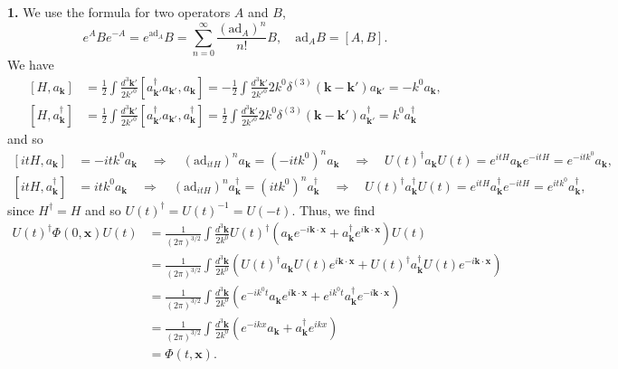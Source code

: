 \textbf{1.} We use the formula for two operators $A$ and $B$,
\begin{equation}
    e^A B e^{-A} = e^{\text{ad}_A} B = \sum_{n=0}^\infty \frac{(\text{ad}_A)^n}{n!} B, \quad \text{ad}_A B = [A, B].
\end{equation}
We have
\begin{equation}
\begin{aligned}
    [H, a_{\mathbf{k}}] &= \frac{1}{2} \int \frac{d^3\mathbf{k}'}{2k'^0} [a^\dagger_{\mathbf{k}'}a_{\mathbf{k}'}, a_{\mathbf{k}}] = -\frac{1}{2} \int \frac{d^3\mathbf{k}'}{2k'^0} 2k^0\delta^{(3)}(\mathbf{k}-\mathbf{k}') a_{\mathbf{k}'} = -k^0 a_{\mathbf{k}}, \\
    [H, a^\dagger_{\mathbf{k}}] &= \frac{1}{2} \int \frac{d^3\mathbf{k}'}{2k'^0} [a^\dagger_{\mathbf{k}'}a_{\mathbf{k}'}, a^\dagger_{\mathbf{k}}] = \frac{1}{2} \int \frac{d^3\mathbf{k}'}{2k'^0} 2k^0\delta^{(3)}(\mathbf{k}-\mathbf{k}') a^\dagger_{\mathbf{k}'} = k^0 a^\dagger_{\mathbf{k}}
\end{aligned}
\end{equation}
and so
\begin{equation}
\begin{aligned}
    [itH, a_{\mathbf{k}}] &= -itk^0 a_{\mathbf{k}} \quad \Rightarrow \quad (\text{ad}_{itH})^n a_{\mathbf{k}} = (-itk^0)^n a_{\mathbf{k}} \quad \Rightarrow \quad U(t)^\dagger a_{\mathbf{k}} U(t) = e^{itH} a_{\mathbf{k}} e^{-itH} = e^{-itk^0} a_{\mathbf{k}}, \\
    [itH, a^\dagger_{\mathbf{k}}] &= itk^0 a_{\mathbf{k}} \quad \Rightarrow \quad (\text{ad}_{itH})^n a^\dagger_{\mathbf{k}} = (itk^0)^n a^\dagger_{\mathbf{k}} \quad \Rightarrow \quad U(t)^\dagger a^\dagger_{\mathbf{k}} U(t) = e^{itH} a^\dagger_{\mathbf{k}} e^{-itH} = e^{itk^0} a^\dagger_{\mathbf{k}},
\end{aligned}
\end{equation}
since $H^\dagger = H$ and so $U(t)^\dagger = U(t)^{-1} = U(-t)$. Thus, we find
\begin{equation}
\begin{aligned}
    U(t)^\dagger \Phi(0, \mathbf{x}) U(t) &= \frac{1}{(2\pi)^{3/2}} \int \frac{d^3\mathbf{k}}{2k^0} U(t)^\dagger (a_{\mathbf{k}}e^{-i\mathbf{k}\cdot\mathbf{x}} + a^\dagger_{\mathbf{k}}e^{i\mathbf{k}\cdot\mathbf{x}}) U(t) \\
    &= \frac{1}{(2\pi)^{3/2}} \int \frac{d^3\mathbf{k}}{2k^0} (U(t)^\dagger a_{\mathbf{k}} U(t) e^{i\mathbf{k}\cdot\mathbf{x}} + U(t)^\dagger a^\dagger_{\mathbf{k}} U(t) e^{-i\mathbf{k}\cdot\mathbf{x}}) \\
    &= \frac{1}{(2\pi)^{3/2}} \int \frac{d^3\mathbf{k}}{2k^0} (e^{-ik^0 t} a_{\mathbf{k}} e^{i\mathbf{k}\cdot\mathbf{x}} + e^{ik^0 t} a^\dagger_{\mathbf{k}} e^{-i\mathbf{k}\cdot\mathbf{x}}) \\
    &= \frac{1}{(2\pi)^{3/2}} \int \frac{d^3\mathbf{k}}{2k^0} (e^{-ikx} a_{\mathbf{k}} + a^\dagger_{\mathbf{k}} e^{ikx}) \\
    &= \Phi(t, \mathbf{x}).
\end{aligned}
\end{equation}


